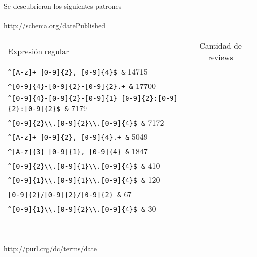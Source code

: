 Se descubrieron los siguientes patrones
\\
\\
http://schema.org/datePublished\\
\begin{tabular}{| l | c |}
Expresión regular & Cantidad de reviews\\
\verb|^[A-z]+ [0-9]{2}, [0-9]{4}$ &| 14715 \\
\verb|^[0-9]{4}-[0-9]{2}-[0-9]{2}.+ &| 17700 \\
\verb|^[0-9]{4}-[0-9]{2}-[0-9]{1} [0-9]{2}:[0-9]{2}:[0-9]{2}$ &| 7179 \\
\verb|^[0-9]{2}\\.[0-9]{2}\\.[0-9]{4}$ &| 7172\\
\verb|^[A-z]+ [0-9]{2}, [0-9]{4}.+ &| 5049\\
\verb|^[A-z]{3} [0-9]{1}, [0-9]{4} &| 1847\\
\verb|^[0-9]{2}\\.[0-9]{1}\\.[0-9]{4}$ &| 410\\
\verb|^[0-9]{1}\\.[0-9]{1}\\.[0-9]{4}$ &| 120\\
\verb|[0-9]{2}/[0-9]{2}/[0-9]{2} &| 67\\
\verb|^[0-9]{1}\\.[0-9]{2}\\.[0-9]{4}$ &| 30
\end{tabular}
\\
\\
http://purl.org/dc/terms/date\\
